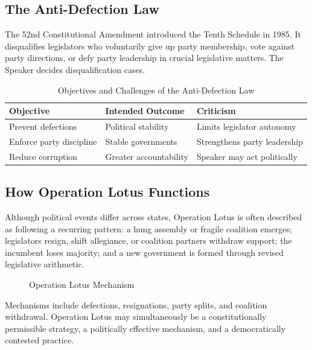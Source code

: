 \documentclass[11pt]{article}
\begin{document}
\subsection{The Anti-Defection Law}
The 52nd Constitutional Amendment introduced the Tenth Schedule in 1985. It disqualifies legislators who voluntarily give up party membership, vote against party directions, or defy party leadership in crucial legislative matters. The Speaker decides disqualification cases.

\begin{table}[h]
\centering
\caption{Objectives and Challenges of the Anti-Defection Law}
\begin{tabularx}{\textwidth}{lll}
\toprule
Objective & Intended Outcome & Criticism\\
\midrule
Prevent defections & Political stability & Limits legislator autonomy\\
Enforce party discipline & Stable governments & Strengthens party leadership\\
Reduce corruption & Greater accountability & Speaker may act politically\\
\bottomrule
\end{tabularx}
\end{table}

\subsection{How Operation Lotus Functions}
Although political events differ across states, Operation Lotus is often described as following a recurring pattern: a hung assembly or fragile coalition emerges; legislators resign, shift allegiance, or coalition partners withdraw support; the incumbent loses majority; and a new government is formed through revised legislative arithmetic.

\begin{figure}[h]
\centering
{}
\caption{Operation Lotus Mechanism}
\end{figure}

Mechanisms include defections, resignations, party splits, and coalition withdrawal. Operation Lotus may simultaneously be a constitutionally permissible strategy, a politically effective mechanism, and a democratically contested practice.
\end{document}
